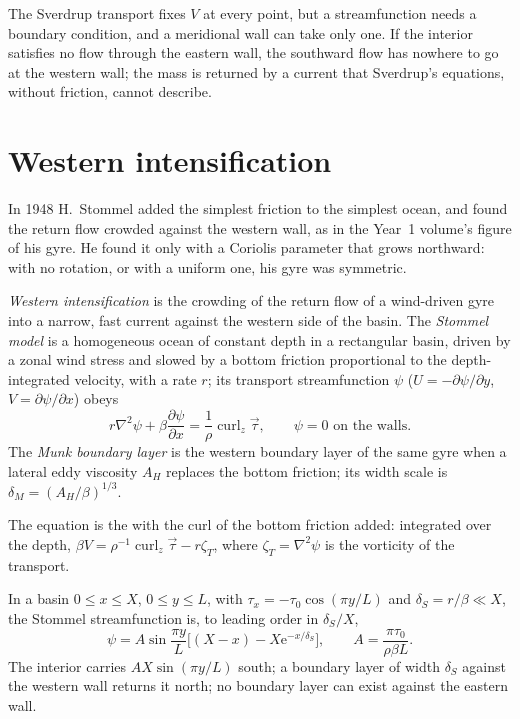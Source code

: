 The Sverdrup transport fixes $V$ at every point, but a streamfunction
needs a boundary condition, and a meridional wall can take only one. If the
interior satisfies no flow through the eastern wall, the southward flow
has nowhere to go at the western wall; the mass is returned by a current
that Sverdrup's equations, without friction, cannot describe.

\section{Western intensification}\label{sec:b3:ocean-dynamics:western}

In 1948 H.~Stommel added the simplest friction to the simplest ocean, and
found the return flow crowded against the western wall, as in the
Year~1 volume's figure of his gyre. He found it only with a Coriolis
parameter that grows northward: with no rotation, or with a uniform one,
his gyre was symmetric.

\begin{definition}\label{def:b3:ocean-dynamics:western-intensification}
\emph{Western intensification} is the
crowding of the return flow of a wind-driven gyre into a narrow, fast
current against the western side of the basin. The \emph{Stommel
model} is a homogeneous ocean of constant depth in a
rectangular basin, driven by a zonal wind stress and slowed by a bottom
friction proportional to the depth-integrated velocity, with a rate $r$;
its transport streamfunction $\psi$ ($U = -\partial\psi/\partial y$, $V =
\partial\psi/\partial x$) obeys
\[
r\nabla^2\psi + \beta\frac{\partial\psi}{\partial x} =
\frac{1}{\rho}\operatorname{curl}_z\vec\tau ,\qquad \psi = 0 \text{ on the walls.}
\]
The \emph{Munk boundary layer} is the western
boundary layer of the same gyre when a lateral eddy viscosity $A_H$
replaces the bottom friction; its width scale is $\delta_M =
(A_H/\beta)^{1/3}$.
\end{definition}

The equation is the  with the curl of the bottom friction
added: integrated over the depth, $\beta V = \rho^{-1}\operatorname{curl}_z
\vec\tau - r\zeta_T$, where $\zeta_T = \nabla^2\psi$ is the vorticity of
the transport.

\begin{theorem}\label{thm:b3:ocean-dynamics:stommel}
In a basin $0 \le x \le X$, $0 \le y \le L$, with $\tau_x = -\tau_0
\cos(\pi y/L)$ and $\delta_S = r/\beta \ll X$, the Stommel streamfunction
is, to leading order in $\delta_S/X$,
\[
\psi = A\sin\frac{\pi y}{L}\Big[(X - x) - X\mathrm e^{-x/\delta_S}\Big],
\qquad A = \frac{\pi\tau_0}{\rho\beta L} .
\]
The interior carries $AX\sin(\pi y/L)$ south; a boundary layer of width
$\delta_S$ against the western wall returns it north; no boundary layer can
exist against the eastern wall.
\end{theorem}


